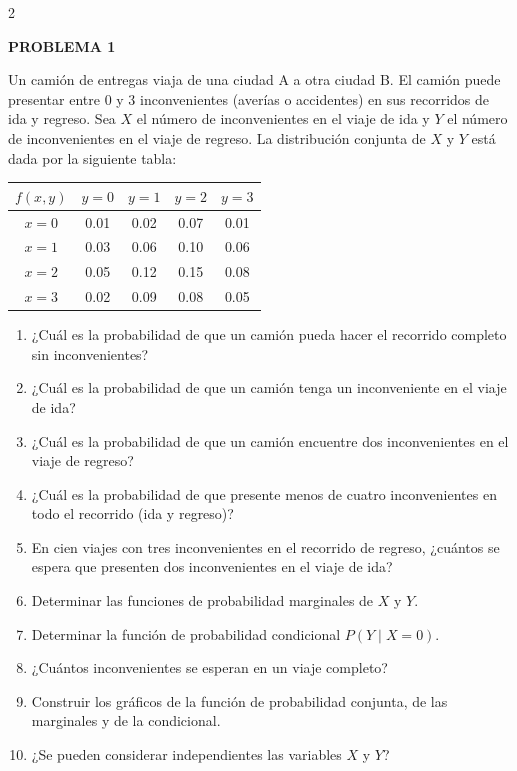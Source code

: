 \documentclass[10pt,letterpaper]{article}
\newcommand{\problema}[1]{%
  \vspace{2pt}
  \noindent\textbf{\large PROBLEMA #1}\par
  \vspace{2pt}
}
\begin{document}
\pagestyle{empty}

\begin{multicols}{2}
\raggedcolumns

\problema{1}

Un camión de entregas viaja de una ciudad A a otra ciudad B. El camión puede
presentar entre 0 y 3 inconvenientes (averías o accidentes) en sus recorridos
de ida y regreso. Sea \(X\) el número de inconvenientes en el viaje de ida y
\(Y\) el número de inconvenientes en el viaje de regreso. La distribución
conjunta de \(X\) y \(Y\) está dada por la siguiente tabla:

\begin{center}
\small
\setlength{\tabcolsep}{5pt}
\begin{tabular}{c|cccc}
\toprule
\(f(x,y)\) & \(y=0\) & \(y=1\) & \(y=2\) & \(y=3\) \\
\midrule
\(x=0\) & 0.01 & 0.02 & 0.07 & 0.01 \\
\(x=1\) & 0.03 & 0.06 & 0.10 & 0.06 \\
\(x=2\) & 0.05 & 0.12 & 0.15 & 0.08 \\
\(x=3\) & 0.02 & 0.09 & 0.08 & 0.05 \\
\bottomrule
\end{tabular}
\end{center}

\begin{enumerate}
\item ¿Cuál es la probabilidad de que un camión pueda hacer el recorrido
completo sin inconvenientes?
\item ¿Cuál es la probabilidad de que un camión tenga un inconveniente en el
viaje de ida?
\item ¿Cuál es la probabilidad de que un camión encuentre dos inconvenientes
en el viaje de regreso?
\item ¿Cuál es la probabilidad de que presente menos de cuatro inconvenientes
en todo el recorrido (ida y regreso)?
\item En cien viajes con tres inconvenientes en el recorrido de regreso,
¿cuántos se espera que presenten dos inconvenientes en el viaje de ida?
\item Determinar las funciones de probabilidad marginales de \(X\) y \(Y\).
\item Determinar la función de probabilidad condicional \(P(Y\mid X=0)\).
\item ¿Cuántos inconvenientes se esperan en un viaje completo?
\item Construir los gráficos de la función de probabilidad conjunta, de las
marginales y de la condicional.
\item ¿Se pueden considerar independientes las variables \(X\) y \(Y\)?
\end{enumerate}


\end{multicols}
\end{document}
